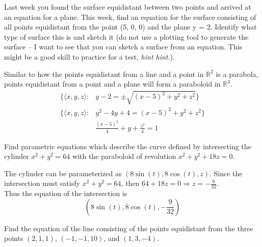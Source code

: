 \documentclass[12pt]{exam}
\begin{document}
\begin{questions}
\clearpage
\question Last week you found the surface equidistant between two points and 
	arrived at an equation for a plane. This week, find an equation for the 
	surface consisting of all points equidistant from the point (5, 0, 0) 
	and the plane y = 2. Identify what type of surface this is and sketch 
	it (do not use a plotting tool to generate the surface – I want to see 
	that you can sketch a surface from an equation. This might be a good
	skill to practice for a test, \textit{hint hint}.).
	\begin{solution}
		Similar to how the points equidistant from a line and a point in $\mathbb{R}^2$ is a parabola, points equidistant from a point and a plane will form a paraboloid in $\mathbb{R}^3$.
		\begin{align*}
			\{ \langle x,y,z \rangle : &y-2 = \pm \sqrt{(x - 5)^2 + y^2 + z^2} \} \\
			\{ \langle x,y,z \rangle : &y^2 - 4y + 4 = (x - 5)^2 + y^2 + z^2 \} \\
			&\boxed{\frac{(x - 5)^2}{4} + y + \frac{z^2}{4} = 1 } \tag*{\qed}
		\end{align*}
	\end{solution}
\clearpage
\question Find parametric equations which describe the curve defined 
	by intersecting the cylinder $x^2 + y^2 = 64$ with the paraboloid of 
	revolution $x^2 + y^2 + 18z = 0$.
	\begin{solution}
		The cylinder can be parameterized as $(8\sin(t), 8\cos(t), z)$. Since the intersection must satisfy $x^2 + y^2 = 64$, then $64 + 18z = 0 \Rightarrow z= -\frac{9}{32}$. \\
		Thus the equation of the intersection is 
		\[\boxed{(8\sin(t), 8\cos(t), -\frac{9}{32})} \tag*{\qed}\]
	\end{solution}
\clearpage
\question Find the equation of the line consisting of the points equidistant 
	from the three points $(2, 1, 1)$, $(-1, -1, 10)$, and $(1, 3, -4)$.
\clearpage
\question 
	\begin{parts} 

\end{parts}
\end{questions}
\end{document}

